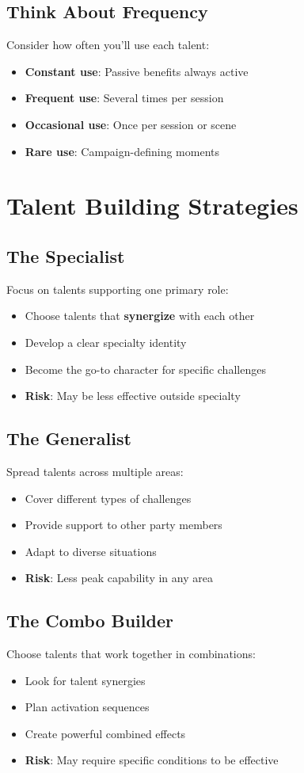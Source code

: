 \begin{multicols}{2}
\subsection*{Think About Frequency}
Consider how often you'll use each talent:
\begin{itemize}
\item \textbf{Constant use}: Passive benefits always active
\item \textbf{Frequent use}: Several times per session
\item \textbf{Occasional use}: Once per session or scene
\item \textbf{Rare use}: Campaign-defining moments
\end{itemize}

\section{Talent Building Strategies}

\subsection*{The Specialist}
Focus on talents supporting one primary role:
\begin{itemize}
\item Choose talents that \textbf{synergize} with each other
\item Develop a clear specialty identity
\item Become the go-to character for specific challenges
\item \textbf{Risk}: May be less effective outside specialty
\end{itemize}

\subsection*{The Generalist}
Spread talents across multiple areas:
\begin{itemize}
\item Cover different types of challenges
\item Provide support to other party members
\item Adapt to diverse situations
\item \textbf{Risk}: Less peak capability in any area
\end{itemize}

\subsection*{The Combo Builder}
Choose talents that work together in combinations:
\begin{itemize}
\item Look for talent synergies
\item Plan activation sequences
\item Create powerful combined effects
\item \textbf{Risk}: May require specific conditions to be effective
\end{itemize}


\end{multicols}
